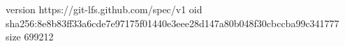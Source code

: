 version https://git-lfs.github.com/spec/v1
oid sha256:8e8b83ff33a6cde7e97175f01440e3eee28d147a80b048f30cbccba99c341777
size 699212
